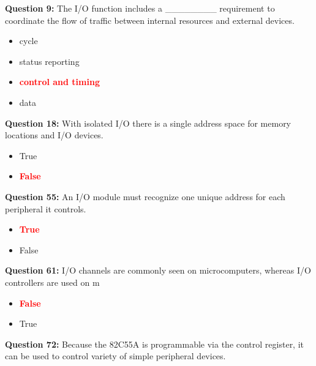 \documentclass[12pt,a4paper]{article}
\begin{document}
\vspace{0.5cm}

\textbf{Question 9:} The I/O function includes a ________ requirement to coordinate the flow of traffic between internal resources and external devices.

\begin{itemize}
    \item[\textbf{A.}] cycle
    \item[\textbf{B.}] status reporting
    \item[\textbf{C.}] \textcolor{red}{\textbf{control and timing}}
    \item[\textbf{D.}] data
\end{itemize}

\vspace{0.5cm}

\textbf{Question 18:} With isolated I/O there is a single address space for memory locations and I/O devices.

\begin{itemize}
    \item[\textbf{A.}] True
    \item[\textbf{B.}] \textcolor{red}{\textbf{False}}
\end{itemize}

\vspace{0.5cm}

\textbf{Question 55:} An I/O module must recognize one unique address for each peripheral it controls.

\begin{itemize}
    \item[\textbf{A.}] \textcolor{red}{\textbf{True}}
    \item[\textbf{B.}] False
\end{itemize}

\vspace{0.5cm}

\textbf{Question 61:} I/O channels are commonly seen on microcomputers, whereas I/O controllers are used on m

\begin{itemize}
    \item[\textbf{A.}] \textcolor{red}{\textbf{False}}
    \item[\textbf{B.}] True
\end{itemize}

\vspace{0.5cm}

\textbf{Question 72:} Because the 82C55A is programmable via the control register, it can be used to control variety of simple peripheral devices.
\end{document}
